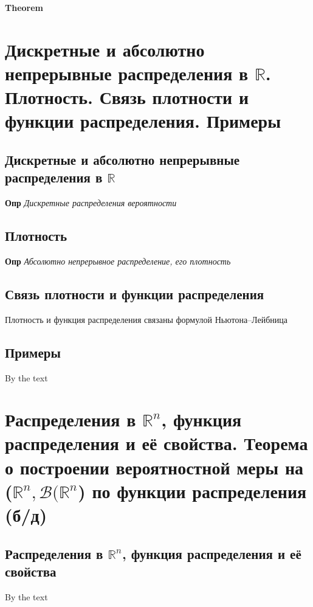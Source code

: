 \documentclass[a4paper, 14pt]{article}
\begin{document}
    \textbf{Theorem}
    
    \section{Дискретные и абсолютно непрерывные распределения в $\mathbb{R}$.
    Плотность.
    Связь плотности и функции распределения.
    Примеры}
    
    \subsection{Дискретные и абсолютно непрерывные распределения в $\mathbb{R}$}
    
    \textbf{Опр} \textit{Дискретные распределения вероятности}
    
    \subsection{Плотность}
    
    \textbf{Опр} \textit{Абсолютно непрерывное распределение, его плотность}
    
    \subsection{Связь плотности и функции распределения}
    
    Плотность и функция распределения связаны формулой Ньютона--Лейбница
    
    \subsection{Примеры}
    
    By the text
    
    \section{Распределения в $\mathbb{R}^n$, функция распределения и её свойства.
    Теорема о построении вероятностной меры на ($\mathbb{R}^n, \mathcal{B}(\mathbb{R}^n$) по функции распределения
        (б/д)}
    
    \subsection{Распределения в $\mathbb{R}^n$, функция распределения и её свойства}
    
    By the text
    
\end{document}
